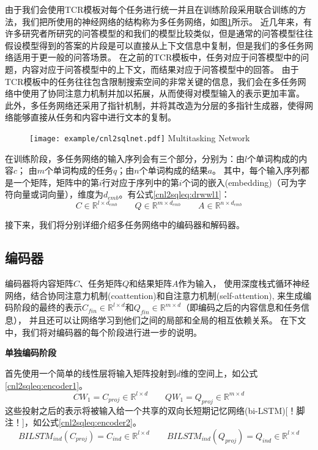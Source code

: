 由于我们会使用TCR模板对每个任务进行统一并且在训练阶段采用联合训练的方法，我们把所使用的神经网络的结构称为多任务网络，如图\ref{fig:cnl2sqlnet}所示。
近几年来，有许多研究者所研究的问答模型的和我们的模型比较类似，但是通常的问答模型往往假设模型得到的答案的片段是可以直接从上下文信息中复制，但是我们的多任务网络适用于更一般的问答场景。
在之前的TCR模板中，任务对应于问答模型中的问题，内容对应于问答模型中的上下文，而结果对应于问答模型中的回答。
由于TCR模板中的任务往往包含限制搜索空间的非常关键的信息，我们会在多任务网络中使用了协同注意力机制\cite{vaswani2017attention}并加以拓展，从而使得对模型输入的表示更加丰富。
此外，多任务网络还采用了指针机制\cite{vinyals2015pointer}，并将其改造为分层的多指针生成器，使得网络能够直接从任务和内容中进行文本的复制。

\begin{figure}[!htp]
  \centering
  \texttt{[image: example/cnl2sqlnet.pdf]}
    {Multitasking Network}
  \label{fig:cnl2sqlnet}
\end{figure}

在训练阶段，多任务网络的输入序列会有三个部分，分别为：由$l$个单词构成的内容$c$；
由$m$个单词构成的任务$q$；由$n$个单词构成的结果$a$。
其中，每个输入序列都是一个矩阵，矩阵中的第$i$行对应于序列中的第$i$个词的嵌入(embedding)（可为字符向量或词向量），维度为$d_{emb}$。有公式\ref{cnl2sqleq:drwwl1}：
\begin{equation}
    \label{cnl2sqleq:drwwl1}
    C \in \mathbb{R}^{l \times d_{emb}} \qquad Q \in \mathbb{R}^{m \times d_{emb}} \qquad A \in \mathbb{R}^{n \times d_{emb}}
  \end{equation}

接下来，我们将分别详细介绍多任务网络中的编码器和解码器。

\subsection{编码器}
\label{cnl2sql:encoder}

编码器将内容矩阵$C$、任务矩阵$Q$和结果矩阵$A$作为输入，
使用深度栈式循环神经网络，结合协同注意力机制(coattention)和自注意力机制(self-attention),
来生成编码阶段的最终的表示$C_{fin} \in \mathbb{R}^{l \times d}$和$Q_{fin} \in \mathbb{R}^{m \times d}$（即编码之后的内容信息和任务信息），
并且还可以让网络学习到他们之间的局部和全局的相互依赖关系。
在下文中，我们将对编码器的每个阶段进行进一步的说明。

\textbf{单独编码阶段}

首先使用一个简单的线性层将输入矩阵投射到$d$维的空间上，如公式\ref{cnl2sqleq:encoder1}。
\begin{equation}
    \label{cnl2sqleq:encoder1}
    CW_1 = C_{proj} \in \mathbb{R}^{l \times d} \qquad QW_1 = Q_{proj} \in \mathbb{R}^{m \times d} 
  \end{equation}
这些投射之后的表示将被输入给一个共享的双向长短期记忆网络(bi-LSTM)\cite{hochreiter1997long,graves2005framewise}[！脚注！]，如公式\ref{cnl2sqleq:encoder2}。
\begin{equation}
    \label{cnl2sqleq:encoder2}
    BILSTM_{ind}(C_{proj}) = C_{ind} \in \mathbb{R}^{l \times d} \qquad BILSTM_{ind}(Q_{proj}) = Q_{ind} \in \mathbb{R}^{l \times d}
\end{equation}

